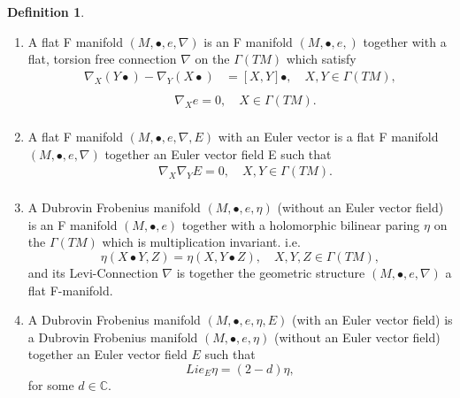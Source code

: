 \documentclass{article}
\theoremstyle{definition}
\newtheorem{definition}{Definition}[section]
\begin{document}
\begin{definition}\cite{David} \cite{Hertling}
\begin{enumerate}
\item A flat F manifold $(M,\bullet,e,\nabla)$ is an F manifold $(M,\bullet,e,)$ together with a flat, torsion free connection $\nabla$ on the $\Gamma(TM)$ which satisfy
\begin{equation}\label{Hertling integrability condition}
\begin{split}
\nabla_X(Y\bullet )-\nabla_Y(X\bullet )&=[X,Y]\bullet, \quad X,Y \in \Gamma(TM),\\
\end{split}
\end{equation}
\begin{equation*}
\begin{split}
&\nabla_Xe=0, \quad X \in \Gamma(TM).\\
\end{split}
\end{equation*}

\item A flat F manifold $(M,\bullet,e,\nabla,E)$ with an Euler vector is a flat F manifold $(M,\bullet,e,\nabla)$ together an Euler vector field E such that
\begin{equation*}
\begin{split}
&\nabla_X\nabla_YE=0, \quad X,Y \in \Gamma(TM).\\
\end{split}
\end{equation*}


\item A Dubrovin Frobenius manifold $(M,\bullet,e,\eta)$ (without an Euler vector field) is an F manifold $(M,\bullet,e)$ together with a holomorphic bilinear paring $\eta$ on the $\Gamma(TM)$ which is multiplication invariant. i.e.
\begin{equation*}
\eta(X\bullet Y,Z)=\eta(X,Y\bullet Z), \quad X,Y,Z \in \Gamma(TM),
\end{equation*}
and its Levi-Connection $\nabla$ is together the geometric structure $(M,\bullet,e,\nabla)$ a flat F-manifold.

\item A Dubrovin Frobenius manifold $(M,\bullet,e,\eta, E)$ (with an Euler vector field) is a Dubrovin Frobenius manifold $(M,\bullet,e,\eta)$ (without an Euler vector field) together an Euler vector field $E$ such that
\begin{equation*}
Lie_E\eta = (2-d)\eta, 
\end{equation*}
for some $d\in \mathbb{C}$.
\end{enumerate}
\end{definition}
\end{document}
